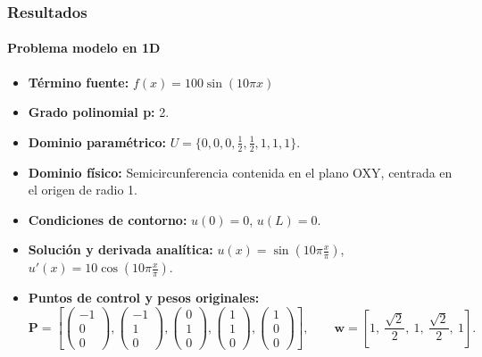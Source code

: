 \documentclass[compress]{beamer}
\begin{document}
\begin{frame}
	\frametitle{Resultados}
	\framesubtitle{Problema modelo en 1D}
	\begin{itemize}
		\item{\textbf{Término fuente:}} $f(x)=100\sin(10\pi x)$
		\item \textbf{Grado polinomial p:} 2.
		\item \textbf{Dominio paramétrico:} $U=\{0,0,0,\frac{1}{2},\frac{1}{2},1,1,1\}$.
		\item \textbf{Dominio físico:} Semicircunferencia contenida en el plano OXY, centrada en el origen de radio 1.
		\item \textbf{Condiciones de contorno:} $u(0)=0$, $u(L)=0$.
		\item \textbf{Solución y derivada analítica:} $u(x)=\sin(10\pi\frac{x}{\pi})$, $u'(x)=10\cos(10\pi\frac{x}{\pi})$.
		\item \textbf{Puntos de control y pesos originales:} 
		{\setlength{\abovedisplayskip}{2pt}
		\setlength{\belowdisplayskip}{0pt}
		\scriptsize
		\begin{equation*}
			\mathbf{P} = \left[ 
			\begin{pmatrix} -1 \\ 0 \\ 0 \end{pmatrix}, 
			\begin{pmatrix} -1 \\ 1 \\ 0 \end{pmatrix}, 
			\begin{pmatrix} 0 \\ 1 \\ 0 \end{pmatrix}, 
			\begin{pmatrix} 1 \\ 1 \\ 0 \end{pmatrix}, 
			\begin{pmatrix} 1 \\ 0 \\ 0 \end{pmatrix} 
			\right],
			\qquad 
			\mathbf{w} = \left[ 1, \ \frac{\sqrt{2}}{2}, \ 1, \ \frac{\sqrt{2}}{2}, \ 1 \right].
		\end{equation*}
		}
	\end{itemize}
\end{frame}
\end{document}
